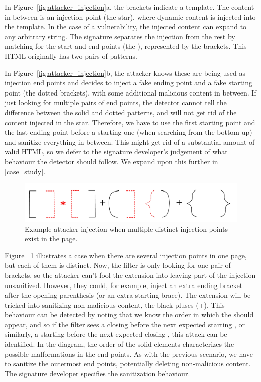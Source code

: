 In Figure~\ref{fig:attacker_injection}a, the brackets indicate a
template. The content in between is an injection point (the star),
where dynamic content is injected into the template. In the case of a
vulnerability, the injected content can expand to any arbitrary
string. The signature separates the injection from the rest by
matching for the start and end points (the ),
represented by the brackets. This HTML originally has two pairs of
 patterns.

In Figure~\ref{fig:attacker_injection}b, the attacker knows these are
being used as injection end points and decides to inject a fake ending
point and a fake starting point (the dotted brackets), with some
additional malicious content in between. If just looking for multiple
pairs of end points, the detector cannot tell the difference between
the solid and dotted patterns, and will not get rid of the content
injected in the star. Therefore, we have to use the first starting
point and the last ending point before a starting one (when searching
from the bottom-up) and sanitize everything in between. This might get
rid of a substantial amount of valid HTML, so we defer to the
signature developer's judgement of what behaviour the detector should
follow. We expand upon this further in \autoref{case_study}.


\begin{figure}[h]
	\includegraphics[scale=0.25]{img/attacker_injection_unique.pdf}
	\caption{Example attacker injection when multiple distinct injection points exist in the page.}
	\label{fig:attacker_injection_unique}
\end{figure}


Figure ~\ref{fig:attacker_injection_unique} illustrates a case when
there are several injection points in one page, but each of them is
distinct. Now, the filter is only looking for one pair of brackets, so
the attacker can't fool the extension into leaving part of the
injection unsanitized. However, they could, for example, inject an
extra ending bracket after the opening parenthesis (or an extra
starting brace). The extension will be tricked into sanitizing
non-malicious content, the black pluses (+). This behaviour can be
detected by noting that we know the order in which the
 should appear, and so if the filter sees a closing
 before the next expected starting , or
similarly, a starting  before the next expected closing
, this attack can be identified. In the diagram, the
order of the solid elements characterizes the possible malformations
in the end points. As with the previous scenario, we have to sanitize
the outermost end points, potentially deleting non-malicious
content. The signature developer specifies the sanitization behaviour.

